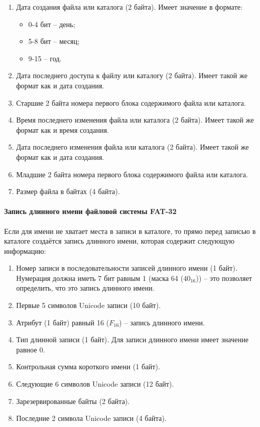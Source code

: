 \begin{enumerate}
\item Дата создания файла или каталога (2 байта). Имеет значение в формате:

	\begin{itemize}
	\item 0-4 бит -- день;
	\item 5-8 бит -- месяц;
	\item 9-15 -- год.
	\end{itemize}
	
\item Дата последнего доступа к файлу или каталогу (2 байта). Имеет такой же формат как и дата создания.
\item Старшие 2 байта номера первого блока содержимого файла или каталога.
\item Время последнего изменения файла или каталога (2 байта). Имеет такой же формат как и время создания.
\item Дата последнего изменения файла или каталога (2 байта). Имеет такой же формат как и дата создания.
\item Младшие 2 байта номера первого блока содержимого файла или каталога.
\item Размер файла в байтах (4 байта).
\end{enumerate}

\paragraph{Запись длинного имени файловой системы FAT-32}

Если для имени не хватает места в записи в каталоге, то прямо перед записью в каталоге создаётся запись длинного имени, которая содержит следующую информацию:

\begin{enumerate}
\item Номер записи в последовательности записей длинного имени (1 байт). Нумерация должна иметь 7 бит равным 1 (маска 64 ($40_{16}$)) -- это позволяет определить, что это запись длинного имени.
\item Первые 5 символов Unicode записи (10 байт).
\item Атрибут (1 байт) равный 16 ($F_{16}$) -- запись длинного имени.
\item Тип длинной записи (1 байт). Для записи длинного имени имеет значение равное 0.
\item Контрольная сумма короткого имени (1 байт).
\item Следующие 6 символов Unicode записи (12 байт).
\item Зарезервированные байты (2 байта).
\item Последние 2 символа Unicode записи (4 байта).
\end{enumerate}

